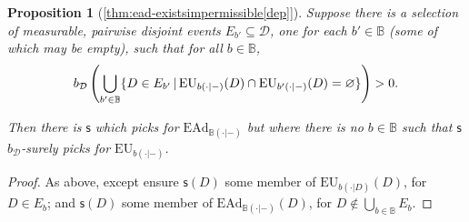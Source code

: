 \documentclass[a4paper]{article}
\newtheorem{theorem}{Theorem}
\newtheorem{proposition}[theorem]{Proposition}
\newtheorem{lemma}[theorem]{Lemma}
\renewcommand\P{\mathbb{P}} %
\newcommand\EU{\mathrm{EU}}
\newcommand\EAd{\mathrm{EAd}}
\newcommand{\Decs}{\mathcal{D}}
\newcommand\s{\mathsf{s}}
\newcommand{\IB}{\mathbb{B}}
\newcommand{\IP}{\P}
\newcommand\SetDelimiter[1][]{
	\nonscript\,#1\vert \allowbreak \nonscript\,\mathopen{}}
\providecommand\given{\SetDelimiter}
\renewcommand{\emptyset}{\varnothing}
\renewcommand{\geq}{\geqslant}
\newenvironment{CCM rewritten}
{\begingroup\color{blue}} %
{\endgroup}              %
\begin{document}
%	
%	
%	
%
%
%

\begin{proposition}[\cref{thm:ead-existsimpermissible[dep]}]
Suppose there is a selection of measurable, pairwise disjoint events $E_{b'}\subseteq\Decs$, one for each $b'\in\IB$ (some of which may be empty),  such that for all $b\in\IB$, $$b_\Decs\left(\bigcup_{b'\in\IB}\{D\in E_{b'}\given \EU_{b(\cdot|-)}(D)\cap \EU_{b'(\cdot|-)}(D)=\emptyset\}\right)>0.$$

Then there is $\s$ which picks for $\EAd_{\IB(\cdot|-)}$ but where there is no $b\in\IB$ such that $\s$  $b_\Decs$-surely picks for $\EU_{b(\cdot|-)}$. 
\end{proposition}
\begin{proof}
	As above, except ensure $\s(D)$ some member of $\EU_{b(\cdot|D)}(D)$, for $D\in E_b$; and $\s(D)$ some member of $\EAd_{\IB(\cdot|-)}(D)$, for $D \notin \bigcup_{b\in\IB}E_b$. 
\end{proof}
\end{document}

